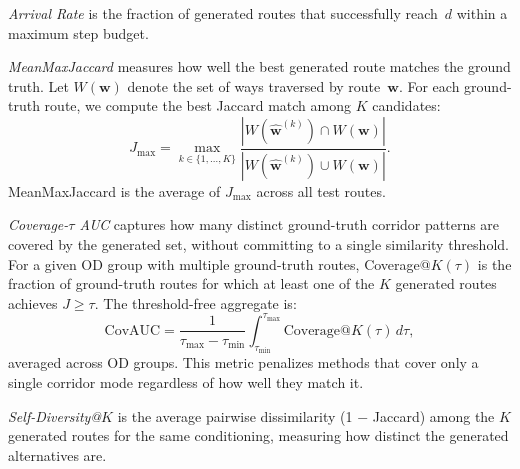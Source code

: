 \textit{Arrival Rate} is the fraction of generated routes that successfully reach~$d$ within a maximum step budget.

\textit{MeanMaxJaccard} measures how well the best generated route matches the ground truth.
Let $W(\mathbf{w})$ denote the set of ways traversed by route~$\mathbf{w}$.
For each ground-truth route, we compute the best Jaccard match among $K$ candidates:
\begin{equation}
  J_{\max} = \max_{k \in \{1,\dots,K\}} \frac{|W(\hat{\mathbf{w}}^{(k)}) \cap W(\mathbf{w})|}{|W(\hat{\mathbf{w}}^{(k)}) \cup W(\mathbf{w})|}.
\end{equation}
MeanMaxJaccard is the average of $J_{\max}$ across all test routes.

\textit{Coverage-$\tau$ AUC} captures how many distinct ground-truth corridor patterns are covered by the generated set, without committing to a single similarity threshold.
For a given OD group with multiple ground-truth routes, Coverage@$K(\tau)$ is the fraction of ground-truth routes for which at least one of the $K$ generated routes achieves $J \geq \tau$.
The threshold-free aggregate is:
\begin{equation}
  \mathrm{CovAUC} = \frac{1}{\tau_{\max} - \tau_{\min}} \int_{\tau_{\min}}^{\tau_{\max}} \mathrm{Coverage}@K(\tau) \, d\tau,
  \label{eq:covauc}
\end{equation}
averaged across OD groups.
This metric penalizes methods that cover only a single corridor mode regardless of how well they match it.

\textit{Self-Diversity@$K$} is the average pairwise dissimilarity (1 $-$ Jaccard) among the $K$ generated routes for the same conditioning, measuring how distinct the generated alternatives are.
